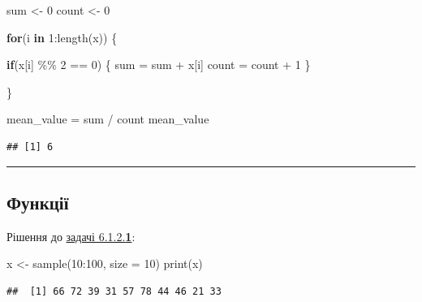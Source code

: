 \documentclass[
]{book}
\newenvironment{Shaded}{\begin{snugshade}}{\end{snugshade}}
\newcommand{\AttributeTok}[1]{\textcolor[rgb]{0.77,0.63,0.00}{#1}}
\newcommand{\ControlFlowTok}[1]{\textcolor[rgb]{0.13,0.29,0.53}{\textbf{#1}}}
\newcommand{\DecValTok}[1]{\textcolor[rgb]{0.00,0.00,0.81}{#1}}
\newcommand{\FunctionTok}[1]{\textcolor[rgb]{0.00,0.00,0.00}{#1}}
\newcommand{\NormalTok}[1]{#1}
\newcommand{\OtherTok}[1]{\textcolor[rgb]{0.56,0.35,0.01}{#1}}
\newcommand{\SpecialCharTok}[1]{\textcolor[rgb]{0.00,0.00,0.00}{#1}}
\begin{document}
\begin{Shaded}
\begin{Highlighting}[]
\NormalTok{sum }\OtherTok{\textless{}{-}} \DecValTok{0}
\NormalTok{count }\OtherTok{\textless{}{-}} \DecValTok{0}

\ControlFlowTok{for}\NormalTok{(i }\ControlFlowTok{in} \DecValTok{1}\SpecialCharTok{:}\FunctionTok{length}\NormalTok{(x)) \{}
  
  \ControlFlowTok{if}\NormalTok{(x[i] }\SpecialCharTok{\%\%} \DecValTok{2} \SpecialCharTok{==} \DecValTok{0}\NormalTok{) \{}
\NormalTok{    sum }\OtherTok{=}\NormalTok{ sum }\SpecialCharTok{+}\NormalTok{ x[i]}
\NormalTok{    count }\OtherTok{=}\NormalTok{ count }\SpecialCharTok{+} \DecValTok{1}
\NormalTok{  \}}
  
\NormalTok{\}}

\NormalTok{mean\_value }\OtherTok{=}\NormalTok{ sum }\SpecialCharTok{/}\NormalTok{ count}
\NormalTok{mean\_value}
\end{Highlighting}
\end{Shaded}

\begin{verbatim}
## [1] 6
\end{verbatim}

\begin{center}\rule{0.5\linewidth}{0.5pt}\end{center}

\hypertarget{chapter622}{%
\subsection{Функції}\label{chapter622}}

Рішення до \protect\hyperlink{task6121}{задачі 6.1.2.\textbf{1}}:

\begin{Shaded}
\begin{Highlighting}[]
\NormalTok{x }\OtherTok{\textless{}{-}} \FunctionTok{sample}\NormalTok{(}\DecValTok{10}\SpecialCharTok{:}\DecValTok{100}\NormalTok{, }\AttributeTok{size =} \DecValTok{10}\NormalTok{)}
\FunctionTok{print}\NormalTok{(x)}
\end{Highlighting}
\end{Shaded}

\begin{verbatim}
##  [1] 66 72 39 31 57 78 44 46 21 33
\end{verbatim}
\end{document}
